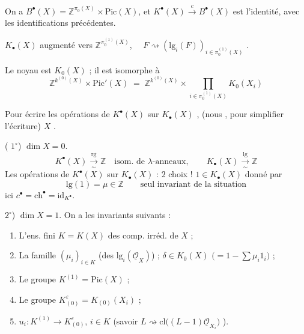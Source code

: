 \documentclass[11pt,a4paper]{article}
\begin{document}
On a $B^{\bullet}(X) = \mathbb{Z}^{\pi_{0}(X)} \times \mathrm{Pic}(X)$, et
$K^{\bullet}(X) \xrightarrow{\ c\ } B^{\bullet}(X)$ est l'identité, avec les
identifications précédentes.

$K_{\bullet}(X)$ augmenté vers $\mathbb{Z}^{\pi_{0}^{(1)}(X)}$,
$\quad F \rightsquigarrow (\mathrm{lg}_{i}(F))_{i \in \pi_{0}^{(1)}(X)}$
\quad [$\pi_{0}^{(1)}(X)$ = ens. des composantes irréductibles de $\dim 1$].

Le noyau est $K_{0}(X)$ ; il est isomorphe à
\[
  \mathbb{Z}^{k^{(0)}(X)} \times \mathrm{Pic}'(X)
  \;=\; \mathbb{Z}^{k^{(0)}(X)} \times \prod_{i \in \pi_{0}^{(1)}(X)} K_{0}(X_{i})
\]

Pour écrire les opérations de $K^{\bullet}(X)$ sur $K_{\bullet}(X)$
, (nous , pour simplifier l'écriture) \quad $X$ \emph{}.


( $1^{\circ}$) \quad $\dim X = 0$.
\[
  K^{\bullet}(X) \xrightarrow[\sim]{\ \mathrm{rg}\ } \mathbb{Z}
  \quad \text{isom. de $\lambda$-anneaux},
  \qquad
  K_{\bullet}(X) \xrightarrow[\sim]{\ \mathrm{lg}\ } \mathbb{Z}
\]
Les opérations de $K^{\bullet}(X)$ sur $K_{\bullet}(X)$ :  $2$
choix ! \quad $1 \in K_{\bullet}(X)$ donné par
\[
  \mathrm{lg}(1) = \mu \in \mathbb{Z}
  \qquad \text{seul invariant de la situation}
\]
ici $c^{\bullet} = \mathrm{ch}^{\bullet} = \mathrm{id}_{K^{\bullet}}$.


$2^{\circ}$) \quad $\dim X = 1$. \quad On a les invariants suivants :

\begin{enumerate}
  \item[a)] L'ens. fini $K = K(X)$ des comp. irréd. de $X$ ;
  \item[b)] La famille $(\mu_{i})_{i \in K}$ (des
        $\mathrm{lg}_{i}(\underline{\mathcal{O}}_{X})$) ; \quad
        $\delta \in K_{0}(X)$ \quad $\bigl(= 1 - \sum \mu_{i} 1_{i}\bigr)$
         ;
  \item[c)] Le groupe \quad $K^{(1)} = \mathrm{Pic}(X)$ ;
  \item[b)] Le groupe \quad $K^{\varepsilon}_{(0)} = K_{(0)}(X_{i})$
        \quad {} ;
  \item[d)] \ill{} \quad $u_{i} : K^{(1)} \to K^{\varepsilon}_{(0)}$,
        \struck{\ill{}} $i \in K$ \quad
        (savoir 
        $L \rightsquigarrow \mathrm{cl}\bigl((L-1)\underline{\mathcal{O}}_{X_{i}}\bigr)$ ).
\end{enumerate}
\end{document}
